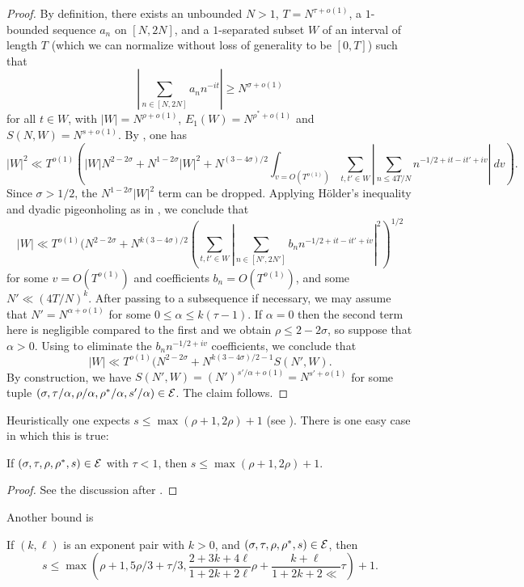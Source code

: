 \begin{proof} By definition, there exists an unbounded $N>1$, $T = N^{\tau+o(1)}$, a $1$-bounded sequence $a_n$ on $[N,2N]$, and a $1$-separated subset $W$ of an interval of length $T$ (which we can normalize without loss of generality to be $[0,T]$) such that
    $$ |\sum_{n \in [N,2N]} a_n n^{-it}| \geq N^{\sigma+o(1)}$$
for all $t \in W$, with $|W| = N^{\rho+o(1)}$, $E_1(W) = N^{\rho^*+o(1)}$ and $S(N,W) = N^{s+o(1)}$.  By \cite[(11.58)]{ivic}, one has
$$ |W|^2 \ll T^{o(1)} ( |W| N^{2-2\sigma} + N^{1-2\sigma} |W|^2 + N^{(3-4\sigma)/2} \int_{v = O(T^{o(1)})} \sum_{t,t' \in W} |\sum_{n \leq 4T/N} n^{-1/2+it-it'+iv}|\ dv ).$$
Since $\sigma>1/2$, the $N^{1-2\sigma} |W|^2$ term can be dropped.  Applying H\"older's inequality and dyadic pigeonholing as in \cite[(11.59)]{ivic}, we conclude that
$$ |W| \ll T^{o(1)} (N^{2-2\sigma} + N^{k(3-4\sigma)/2}  (\sum_{t,t' \in W} |\sum_{n \in [N',2N']} b_n n^{-1/2+it-it'+iv}|^2)^{1/2}$$
for some $v = O(T^{o(1)})$ and coefficients $b_n = O(T^{o(1)})$, and some $N' \ll (4T/N)^k$.  After passing to a subsequence if necessary, we may assume that $N' = N^{\alpha+o(1)}$ for some $0 \leq \alpha \leq k(\tau-1)$.  If $\alpha=0$ then the second term here is negligible compared to the first and we obtain $\rho \leq 2-2\sigma$, so suppose that $\alpha > 0$.  Using \cite[Lemma 11.1]{ivic} to eliminate the $b_n n^{-1/2+iv}$ coefficients, we conclude that
$$ |W| \ll T^{o(1)} (N^{2-2\sigma} + N^{k(3-4\sigma)/2-1} S(N', W).$$
By construction, we have $S(N',W) = (N')^{s'/\alpha+o(1)} = N^{s'+o(1)}$ for some tuple $(\sigma, \tau/\alpha, \rho/\alpha, \rho^*/\alpha, s'/\alpha) \in \mathcal{E}$.  The claim follows.
\end{proof}

Heuristically one expects $s \leq \max( \rho+1, 2\rho)+1$ (see \cite[(11.63)]{ivic}).  There is one easy case in which this is true:

\begin{lemma}  If $(\sigma,\tau,\rho,\rho^*,s) \in \mathcal{E}$ with $\tau < 1$, then $s \leq \max(\rho+1, 2\rho)+1$.
\end{lemma}

\begin{proof} See the discussion after \cite[(11.63)]{ivic}.
\end{proof}

Another bound is

\begin{lemma}\cite[Lemma 11.2]{ivic}  If $(k,\ell)$ is an exponent pair with $k>0$, and $(\sigma,\tau,\rho,\rho^*,s) \in \mathcal{E}$, then
$$ s \leq \max( \rho+1, 5\rho/3 + \tau/3, \frac{2+3k+4\ell}{1+2k+2\ell} \rho + \frac{k+\ell}{1+2k+2\ll} \tau) + 1.$$
\end{lemma}

